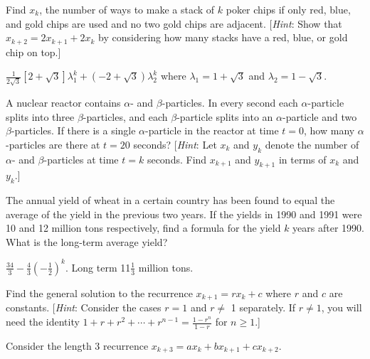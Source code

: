 \begin{multicols}{2}
\begin{ex}
Find $x_{k}$, the number of ways to make a stack of $k$ poker chips if only red, blue, and gold chips are used and no two gold chips are adjacent. [\textit{Hint}: Show that $x_{k+2} = 2x_{k+1} + 2x_{k}$ by considering how many stacks have a red, blue, or gold chip on top.]

\begin{sol}
$\frac{1}{2\sqrt{3}} \left[ 2 +\sqrt{3} \right] \lambda_1^k + (-2 + \sqrt{3}) \lambda_2^k$ where $ \lambda_1 = 1 +  \sqrt{3}$ and $ \lambda_2 = 1 -  \sqrt{3}$. 
\end{sol}
\end{ex}

\begin{ex}
A nuclear reactor contains $\alpha$- and $\beta$-particles. In every second each $\alpha$-particle splits into three $\beta$-particles, and each $\beta$-particle splits into an $\alpha$-particle and two $\beta$-particles. If there is a single $\alpha$-particle in the reactor at time $t = 0$, how many $\alpha$-particles are there at $t = 20$ seconds? [\textit{Hint}: Let $x_{k}$ and $y_{k}$ denote the number of $\alpha$- and $\beta$-particles at time $t = k$ seconds. Find $x_{k+1}$ and $y_{k+1}$ in terms of $x_{k}$ and $y_{k}$.]
\end{ex}

\begin{ex}
The
 annual yield of wheat in a certain country has been found to equal the 
average of the yield in the previous two years. If the yields in 1990 
and 1991 were 10 and 12 million tons respectively, find a formula for 
the yield $k$ years after 1990. What is the long-term average yield?

\begin{sol}
$\frac{34}{3} - \frac{4}{3}\left( -\frac{1}{2} \right)^k$. Long term 11$\frac{1}{3}$ million tons.
\end{sol}
\end{ex}

\begin{ex}
Find the general solution to the recurrence $x_{k+1} = rx_{k} + c$ where $r$ and $c$ are constants. [\textit{Hint}: Consider the cases $r = 1$ and $r \neq$ 1 separately. If $r \neq 1$, you will need the identity $ 1 + r + r^2 + \cdots + r^{n-1} = \frac{1 - r^n}{1-r}$  for  $n \geq 1$.]
\end{ex}

\begin{ex}
Consider the length $3$ recurrence \newline $x_{k+3} = ax_{k} + bx_{k+1} + cx_{k+2}$.



\end{ex}
\end{multicols}
